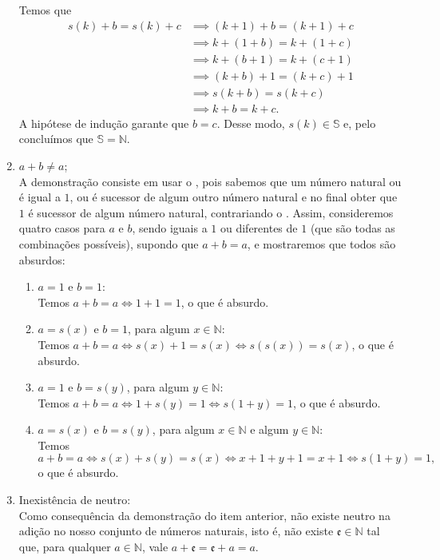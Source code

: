 \documentclass[../main.tex]{subfiles}
\begin{document}
\begin{dem}
\begin{enumerate}[label=(\roman*)]
            Temos que
            \begin{align*}
                s(k) + b = s(k) + c &\implies (k+1)+b = (k+1)+c \\
                &\implies k+(1+b) = k+(1+c) \\
                &\implies k+ (b+1) = k + (c+1) \\
                &\implies (k + b) + 1 = (k + c) + 1 \\
                &\implies s(k+b) = s(k+c)\\
                &\implies k+b = k+c. 
            \end{align*}
            A hipótese de indução garante que $b = c$. Desse modo, $s(k) \in \mathbb{S}$ e, pelo  concluímos que $\mathbb{S} = \mathbb{N}$. 
        \item $a + b \neq a$;\\
            A demonstração consiste em usar o , pois sabemos que um número natural ou é igual a $1$, ou é sucessor de algum outro número natural e no final obter que $1$ é sucessor de algum número natural, contrariando o . Assim, consideremos quatro casos para $a$ e $b$, sendo iguais a $1$ ou diferentes de $1$ (que são todas as combinações possíveis), supondo que $a+b=a$, e mostraremos que todos são absurdos:
            \begin{enumerate}[label=(\arabic*)]
            \item $a=1$ e $b=1$: \\
                Temos $a+b=a \iff 1+1=1$, o que é absurdo. 
            \item $a=s(x)$ e $b=1$, para algum $x \in \mathbb{N}$: \\
                Temos $a+b=a \iff s(x) + 1 = s(x) \iff s(s(x)) = s(x)$, o que é absurdo. 
            \item $a=1$ e $b=s(y)$, para algum $y \in \mathbb{N}$: \\
                Temos $a+b=a \iff 1+ s(y) = 1 \iff s(1+y) = 1$, o que é absurdo. 
            \item $a=s(x)$ e $b=s(y)$, para algum $x \in \mathbb{N}$ e algum $y \in \mathbb{N}$: \\
                Temos 
                \[ a+b=a \iff s(x) + s(y) = s(x) \iff x + 1 + y + 1 = x + 1 \iff s(1 + y) = 1, \]
                o que é absurdo.
            \end{enumerate}
    
        \item Inexistência de neutro: \\
            Como consequência da demonstração do item anterior, não existe neutro na adição no nosso conjunto de números naturais, isto é, não existe $\mathfrak{e} \in \mathbb{N}$ tal que, para qualquer $a \in \mathbb{N}$, vale $a + \mathfrak{e} = \mathfrak{e} + a = a$.
    \end{enumerate}
\end{dem}
 
\end{document}
